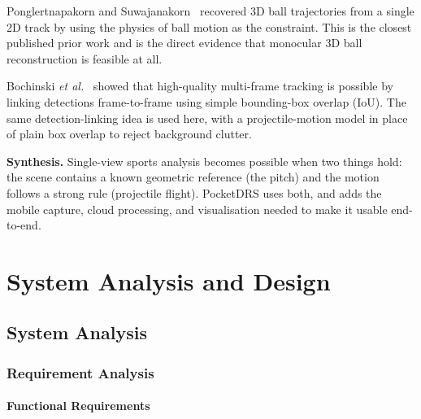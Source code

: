 \documentclass[12pt,a4paper]{report}
\begin{document}
Ponglertnapakorn and Suwajanakorn~\cite{ponglertnapakorn2025} recovered 3D ball trajectories from a single 2D track by using the physics of ball motion as the constraint. This is the closest published prior work and is the direct evidence that monocular 3D ball reconstruction is feasible at all.

Bochinski \textit{et al.}~\cite{bochinski2017} showed that high-quality multi-frame tracking is possible by linking detections frame-to-frame using simple bounding-box overlap (IoU). The same detection-linking idea is used here, with a projectile-motion model in place of plain box overlap to reject background clutter.

\textbf{Synthesis.} Single-view sports analysis becomes possible when two things hold: the scene contains a known geometric reference (the pitch) and the motion follows a strong rule (projectile flight). PocketDRS uses both, and adds the mobile capture, cloud processing, and visualisation needed to make it usable end-to-end.

\chapter{System Analysis and Design}

\section{System Analysis}

\subsection{Requirement Analysis}

\subsubsection{Functional Requirements}
\end{document}
